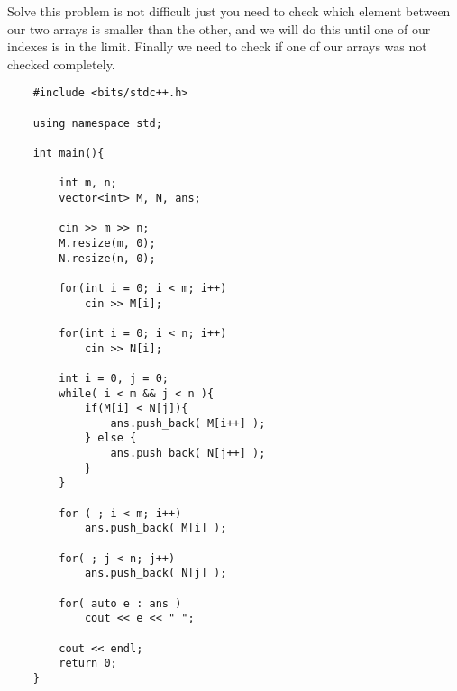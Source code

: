 Solve this problem is not difficult just you need to check which element between our two arrays is smaller than the other, and we will do this until one of our indexes is in the limit. Finally we need to check if one of our arrays was not checked completely. 
\begin{lstlisting}
    #include <bits/stdc++.h>

    using namespace std;

    int main(){

        int m, n;
        vector<int> M, N, ans;

        cin >> m >> n;
        M.resize(m, 0);
        N.resize(n, 0);

        for(int i = 0; i < m; i++)
            cin >> M[i];

        for(int i = 0; i < n; i++)
            cin >> N[i];

        int i = 0, j = 0;
        while( i < m && j < n ){
            if(M[i] < N[j]){
                ans.push_back( M[i++] );
            } else {
                ans.push_back( N[j++] );
            }
        }

        for ( ; i < m; i++)
            ans.push_back( M[i] );

        for( ; j < n; j++)
            ans.push_back( N[j] );

        for( auto e : ans )
            cout << e << " ";
        
        cout << endl;
        return 0;
    }
\end{lstlisting}